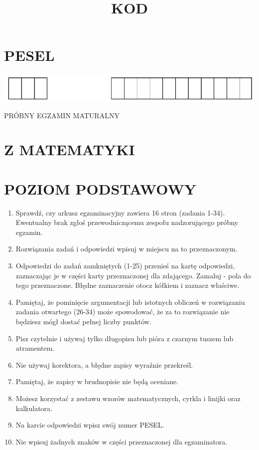 \documentclass[10pt]{article}
\title{KOD }
\author{}
\date{}
\begin{document}
\maketitle
\section*{PESEL}
\begin{center}
\includegraphics[max width=\textwidth]{2024_11_21_9a9f600c3b3af5013d80g-01(2)}
\end{center}

PRÓBNY EGZAMIN MATURALNY

\section*{Z MATEMATYKI}
\section*{POZIOM PODSTAWOWY}
\begin{enumerate}
  \item Sprawdź, czy arkusz egzaminacyjny zawiera 16 stron (zadania 1-34). Ewentualny brak zgłoś przewodniczącemu zespołu nadzorującego próbny egzamin.
  \item Rozwiązania zadań i odpowiedzi wpisuj w miejscu na to przeznaczonym.
  \item Odpowiedzi do zadań zamkniętych (1-25) przenieś na kartę odpowiedzi, zaznaczając je w części karty przeznaczonej dla zdającego. Zamaluj - pola do tego przeznaczone. Błędne zaznaczenie otocz kółkiem i zaznacz właściwe.
  \item Pamiętaj, że pominięcie argumentacji lub istotnych obliczeń w rozwiązaniu zadania otwartego (26-34) może spowodować, że za to rozwiązanie nie będziesz mógł dostać pełnej liczby punktów.
  \item Pisz czytelnie i używaj tylko długopisu lub pióra z czarnym tuszem lub atramentem.
  \item Nie używaj korektora, a błędne zapisy wyraźnie przekreśl.
  \item Pamiętaj, że zapisy w brudnopisie nie będą oceniane.
  \item Możesz korzystać z zestawu wzorów matematycznych, cyrkla i linijki oraz kalkulatora.
  \item Na karcie odpowiedzi wpisz swój numer PESEL.
  \item Nie wpisuj żadnych znaków w części przeznaczonej dla egzaminatora.
\end{enumerate}
\end{document}
